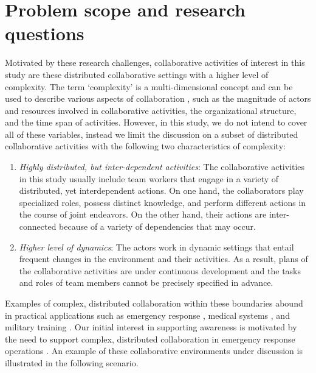 \section{Problem scope and research questions}
\label{sec:problem_scope}
 Motivated by these research challenges, collaborative activities of interest in this study are these distributed collaborative settings with a higher level of complexity. The term `complexity' is a multi-dimensional concept and can be used to describe various aspects of collaboration \cite{Schmidt2002}, such as the magnitude of actors and resources involved in collaborative activities, the organizational structure, and the time span of activities. However, in this study, we do not intend to cover all of these variables, instead we limit the discussion on a subset of distributed collaborative activities with the following two characteristics of complexity:

\begin{enumerate}
\item \emph{Highly distributed, but inter-dependent activities}: The collaborative activities in this study usually include team workers that engage in a variety of distributed, yet interdependent actions. On one hand, the collaborators play specialized roles, possess distinct knowledge, and perform different actions in the course of joint endeavors. On the other hand, their actions are inter-connected because of a variety of dependencies that may occur. 

\item \emph{Higher level of dynamics}: The actors work in dynamic settings that entail frequent changes in the environment and their activities. As a result, plans of the collaborative activities are under continuous development and the tasks and roles of team members cannot be precisely specified in advance.
\end{enumerate}

Examples of complex, distributed collaboration within these boundaries abound in practical applications such as emergency response \cite{Turoff2004}, medical systems \cite{Blandford2004}, and military training \cite{mathieu2000influence}. Our initial interest in supporting awareness is motivated by the need to support complex, distributed collaboration in emergency response operations \cite{Cai2005b,Cai2005a}. An example of these collaborative environments under discussion is illustrated in the following scenario.

